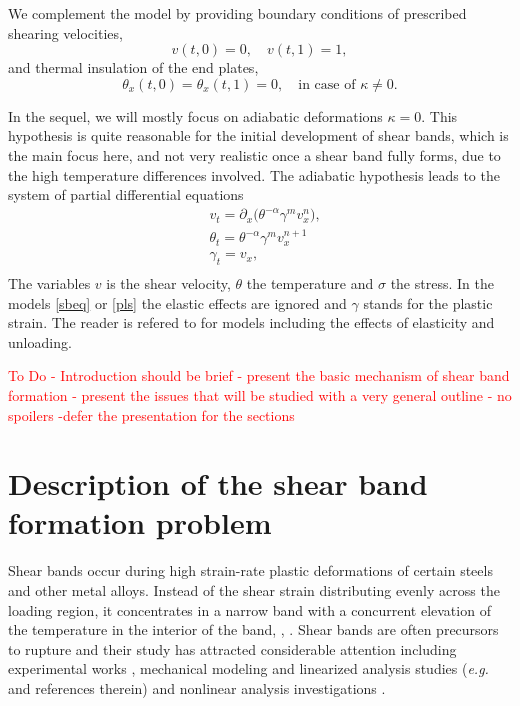 \documentclass[a4paper,11pt]{article}
\newcommand{\del}{\partial}
\newcommand{\tcr}{\textcolor{red}}
\theoremstyle{remark}
\begin{document}
We complement the model by providing boundary conditions of prescribed shearing velocities,
\begin{equation} \label{BCOND1}
 v(t,0)=0, \quad v(t,1)=1, 
\end{equation}
and thermal insulation of the end plates,
\begin{equation} \label{BCOND2}
 \theta_x(t,0)=\theta_x(t,1)=0, \quad \text{in case of $\kappa\ne0$.}
\end{equation}



In the sequel, we will mostly focus on adiabatic deformations $\kappa = 0$. This hypothesis is quite reasonable for the initial development of shear bands,
which is the main focus here, and not very realistic once a shear band fully forms, due to the high temperature differences involved.
The adiabatic hypothesis leads to the system of partial differential equations
\begin{equation}
  \label{pls}
  \begin{aligned}
    & v_{t} = \del_x \Big ( \theta^{-\alpha}\gamma^{m}  v_{x}^n \Big )  ,\\
    & \theta_{t} =  \theta^{-\alpha}\gamma^{m} v_{x}^{n+1}   \\
    & \gamma_{t} = v_{x},  \\
  \end{aligned}
\end{equation}
The variables $v$ is the shear velocity, $\theta$ the temperature and $\sigma$ the stress.
In the models \eqref{sbeq} or \eqref{pls} the elastic effects are ignored and $\gamma$ stands for the plastic strain. The reader is refered to
\cite{SC89} for models including the effects of elasticity and unloading.


\tcr{To Do -  Introduction should be brief - present the basic mechanism of shear band formation - present the issues that 
will be studied with a very general outline - no spoilers -defer the presentation for the sections }


 
\vfil\eject

 
 \section{Description of the shear band formation problem}
\label{mathmodel}

Shear bands occur during
high strain-rate plastic deformations of certain steels and other metal alloys. Instead of the shear strain distributing evenly across the loading region, 
it concentrates in a narrow band with a concurrent elevation of the temperature in the interior of the band, ,  \cite{ZH44,HDH87}.
Shear bands are often precursors to rupture and their study has attracted considerable
attention including  experimental works  \cite{CCHD79,HDH87}, mechanical modeling 
and  linearized analysis studies  ({\it e.g.} \cite{CDHS84,FM87,MC87,SC89,Wright02} and references therein) and
nonlinear analysis investigations  \cite{DH83,Tzavaras87,BPV91}.
\end{document}
